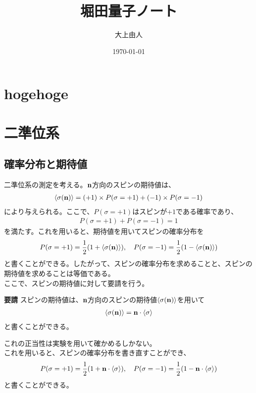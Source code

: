 \documentclass[a4paper,11pt]{jsarticle}
\begin{document}
\title{堀田量子ノート}
\author{大上由人}
\date{\today}
\maketitle

\section{hogehoge}

\section{二準位系}
\subsection{確率分布と期待値}
二準位系の測定を考える。$\vb n$方向のスピンの期待値は、
\begin{align}
    \ev{\sigma(\vb n)}= (+1)\times P(\sigma = +1) + (-1)\times P(\sigma = -1)
\end{align}
により与えられる。ここで、$P(\sigma = +1)$はスピンが$+1$である確率であり、
\begin{align}
    P(\sigma = +1) + P(\sigma = -1) = 1
\end{align}
を満たす。これを用いると、期待値を用いてスピンの確率分布を
\begin{align}
    P(\sigma = +1) = \frac{1}{2}(1 + \ev{\sigma(\vb n)}), \quad P(\sigma = -1) = \frac{1}{2}(1 - \ev{\sigma(\vb n)})
\end{align}
と書くことができる。したがって、スピンの確率分布を求めることと、スピンの期待値を求めることは等価である。\\
ここで、スピンの期待値に対して要請を行う。
\begin{itembox}[l]{\textbf{要請}}
    スピンの期待値は、$\vb n$方向のスピンの期待値$\ev{\sigma(\vb n)}$を用いて
    \begin{align}
        \ev{\sigma(\vb n)} = \vb n \cdot \ev{\vb \sigma}
    \end{align}
    と書くことができる。
\end{itembox}
これの正当性は実験を用いて確かめるしかない。\\
これを用いると、スピンの確率分布を書き直すことができ、
\begin{align}
    P(\sigma = +1) = \frac{1}{2}(1 + \vb n \cdot \ev{\vb \sigma}), \quad P(\sigma = -1) = \frac{1}{2}(1 - \vb n \cdot \ev{\vb \sigma})
\end{align}
と書くことができる。\\
\end{document}
